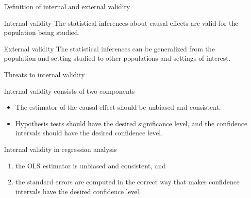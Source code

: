 \documentclass[presentation,10pt]{beamer}
\begin{document}
\begin{frame}[label={sec:org558b7ad}]{Definition of internal and external validity}
\begin{block}{Internal validity}
The statistical inferences about causal effects are valid for the
population being studied.
\end{block}

\begin{block}{External validity}
The statistical inferences can be generalized from the population and
setting studied to other populations and settings of interest. 
\end{block}
\end{frame}

\begin{frame}[label={sec:org10add6d}]{Threats to internal validity}
\begin{block}{Internal validity consists of two components}
\begin{itemize}
\item The estimator of the causal effect should be unbiased and
consistent.
\item Hypothesis tests should have the desired significance level, and the
confidence intervals should have the desired confidence level.
\end{itemize}
\end{block}

\begin{block}{Internal validity in regression analysis}
\begin{enumerate}
\item the OLS estimator is unbiased and consistent, and
\item the standard errors are computed in the correct way that makes
confidence intervals have the desired confidence level.
\end{enumerate}
\end{block}
\end{frame}
\end{document}
